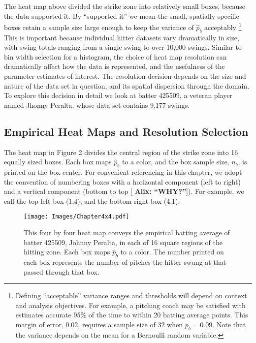 \documentclass{article}
\begin{document}
The heat map above divided the strike zone into relatively small boxes, because the data supported it. By ``supported it'' we mean the small, spatially specific boxes retain a sample size large enough to keep the variance of $\hat{p}_{b}$ acceptably \footnote{Defining ``acceptable'' variance ranges and thresholds will depend on context and analysis objectives. For example, a pitching coach may be satisfied with estimates accurate 95\% of the time to within 20 batting average points. This margin of error, 0.02, requires a sample size of 32 when $p_{b} = 0.09$. Note that the variance depends on the mean for a Bernoulli random variable.} This is important because individual hitter datasets vary dramatically in size, with swing totals ranging from a single swing to over 10,000 swings. Similar to bin width selection for a histogram, the choice of heat map resolution can dramatically affect how the data is represented, and the usefulness of the parameter estimates of interest. The resolution decision depends on the size and nature of the data set in question, and its spatial dispersion through the domain. To explore this decision in detail we look at batter 425509, a veteran player named Jhonny Peralta, whose data set contains 9,177 swings.

\subsection{Empirical Heat Maps and Resolution Selection} %

The heat map in Figure 2 divides the central region of the strike zone into 16 equally sized boxes. Each box maps $\hat{p}_{b}$ to a color, and the box sample size, $n_{b}$, is printed on the box center. For convenient referencing in this chapter, we adopt the convention of numbering boxes with a horizontal component (left to right) and a vertical component (bottom to top [ {\bf Alix: ``WHY?''}]). For example, we call the top-left box (1,4), and the bottom-right box (4,1). 
        \begin{figure}[H]
      	\centering
      	\texttt{[image: Images/Chapter4x4.pdf]} 
      	\caption{This four by four heat map conveys the empirical batting average of batter 425509, Johnny Peralta, in each of 16 square regions of the hitting zone. Each box maps $\hat{p}_{b}$ to a color. The number printed on each box represents the number of pitches the hitter swung at that passed through that box.}
      	\end{figure} 
\end{document}
